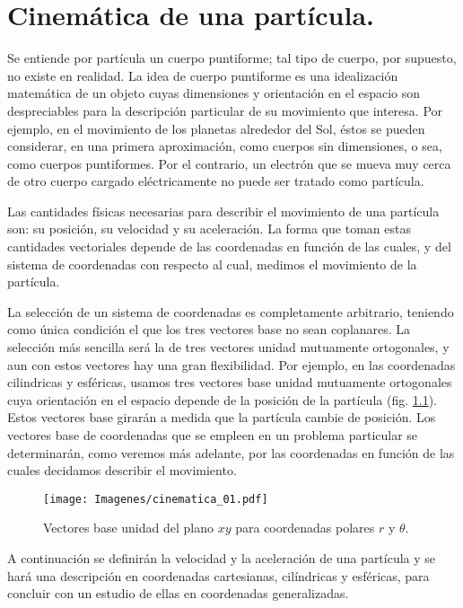 % 

\chapter{Cinemática de una partícula.}

Se entiende por partícula un cuerpo puntiforme; tal tipo de cuerpo, por supuesto, no existe en realidad. La idea de cuerpo puntiforme es una idealización matemática de un objeto cuyas dimensiones y orientación en el espacio son despreciables para la descripción particular de su movimiento que interesa. Por ejemplo, en el movimiento de los planetas alrededor del Sol, éstos se pueden considerar, en una primera aproximación, como cuerpos sin dimensiones, o sea, como cuerpos puntiformes. Por el contrario, un electrón que se mueva muy cerca de otro cuerpo cargado eléctricamente no puede ser tratado como partícula.
\par
Las cantidades físicas necesarias para describir el movimiento de una partícula son: su posición, su velocidad y su aceleración. La forma que toman estas cantidades vectoriales depende de las coordenadas en función de las cuales, y del sistema de coordenadas con respecto al cual, medimos el movimiento de la partícula.
\par
La selección de un sistema de coordenadas es completamente arbitrario, teniendo como única condición el que los tres vectores base no sean coplanares. La selección más sencilla será la de tres vectores unidad mutuamente ortogonales, y aun con estos vectores hay una gran flexibilidad. Por ejemplo, en las coordenadas cilindricas y esféricas, usamos tres vectores base unidad mutuamente ortogonales cuya orientación en el espacio depende de la posición de la partícula (fig. \ref{fig:figura_02_01}). Estos vectores base girarán a medida que la partícula cambie de posición. Los vectores base de coordenadas que se empleen en un problema particular se determinarán, como veremos más adelante, por las coordenadas en función de las cuales decidamos describir 
el movimiento.
\begin{figure}[H]
    \centering
    \texttt{[image: Imagenes/cinematica\_01.pdf]}
    \caption{Vectores base unidad del plano $xy$ para coordenadas polares $r$ y $\theta$.}
    \label{fig:figura_02_01}    
\end{figure}
A continuación se definirán la velocidad y la aceleración de una partícula y se hará una descripción en coordenadas cartesianas, cilíndricas y esféricas, para concluir con un estudio de ellas en coordenadas generalizadas.


